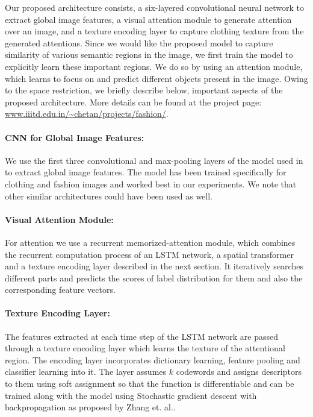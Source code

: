\documentclass{article}
\begin{document}
Our proposed architecture consists, a six-layered convolutional neural network to extract global image features, a visual attention module to generate attention over an image, and a texture encoding layer to capture clothing texture from the generated attentions. Since we would like the proposed model to capture similarity of various semantic regions in the image, we first train the model to explicitly learn these important regions. We do so by using an attention module, which learns to focus on and predict different objects present in the image. Owing to the space restriction, we briefly describe below, important aspects of the proposed architecture. More details can be found at the project page: \url{www.iiitd.edu.in/~chetan/projects/fashion/}. 

\paragraph*{CNN for Global Image Features:}

We use the first three convolutional and max-pooling layers of the model used in \cite{SimoSerraCVPR2016} to extract global image features. The model has been trained specifically for clothing and fashion images and worked best in our experiments. We note that other similar architectures could have been used as well.

\paragraph*{Visual Attention Module: }

For attention we use a recurrent memorized-attention module, which combines the recurrent computation process of an LSTM network, a spatial transformer\cite{JaderbergNIPS2015} and a texture encoding layer \cite{ZhangCVPR2017} described in the next section. It iteratively searches different parts and predicts the scores of label distribution for them and also the corresponding feature vectors.

\paragraph*{Texture Encoding Layer: }

The features extracted at each time step of the LSTM network are passed through a texture encoding layer which learns the texture of the attentional region. The encoding layer incorporates dictionary learning, feature pooling and classifier learning into it. The layer assumes $k$ codewords and assigns descriptors to them using soft assignment so that the function is differentiable and can be trained along with the model using Stochastic gradient descent with backpropagation as proposed by Zhang et. al.\cite{ZhangCVPR2017}.
\end{document}
